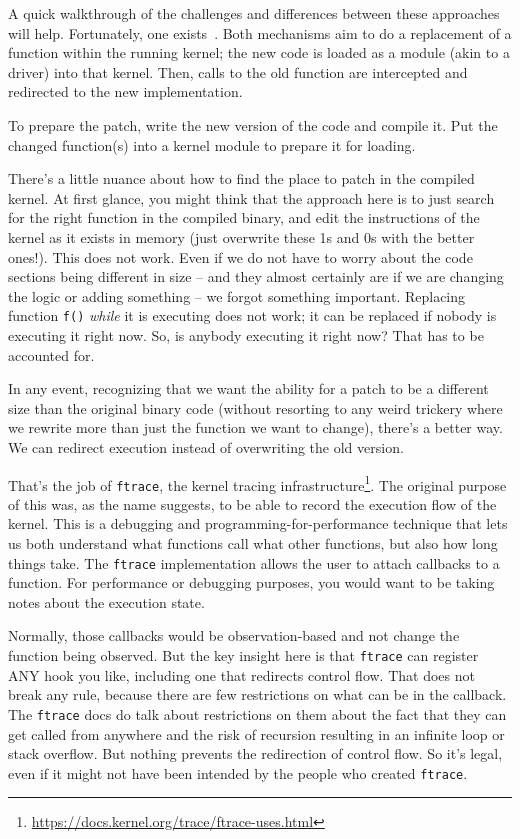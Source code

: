 A quick walkthrough of the challenges and differences between these approaches will help. Fortunately, one exists~\cite{first-kpatch}. Both mechanisms aim to do a replacement of a function within the running kernel; the new code is loaded as a module (akin to a driver) into that kernel. Then, calls to the old function are intercepted and redirected to the new implementation. 

To prepare the patch, write the new version of the code and compile it. Put the changed function(s) into a kernel module to prepare it for loading.

There's a little nuance about how to find the place to patch in the compiled kernel. At first glance, you might think that the approach here is to just search for the right function in the compiled binary, and edit the instructions of the kernel as it exists in memory (just overwrite these 1s and 0s with the better ones!). This does not work. Even if we do not have to worry about the code sections being different in size -- and they almost certainly are if we are changing the logic or adding something -- we forgot something important. Replacing function \texttt{f()} \textit{while} it is executing does not work; it can be replaced if nobody is executing it right now. So, is anybody executing it right now? That has to be accounted for.

In any event, recognizing that we want the ability for a patch to be a different size than the original binary code (without resorting to any weird trickery where we rewrite more than just the function we want to change), there's a better way. We can redirect execution instead of overwriting the old version.

That's the job of \texttt{ftrace}, the kernel tracing infrastructure\footnote{ \url{https://docs.kernel.org/trace/ftrace-uses.html} }. The original purpose of this was, as the name suggests, to be able to record the execution flow of the kernel. This is a debugging and programming-for-performance technique that lets us both understand what functions call what other functions, but also how long things take. The \texttt{ftrace} implementation allows the user to attach callbacks to a function. For performance or debugging purposes, you would want to be taking notes about the execution state.

Normally, those callbacks would be observation-based and not change the function being observed. But the key insight here is that \texttt{ftrace} can register ANY hook you like, including one that redirects control flow. That does not break any rule, because there are few restrictions on what can be in the callback. The \texttt{ftrace} docs do talk about restrictions on them about the fact that they can get called from anywhere and the risk of recursion resulting in an infinite loop or stack overflow. But nothing prevents the redirection of control flow. So it's legal, even if it might not have been intended by the people who created \texttt{ftrace}.

